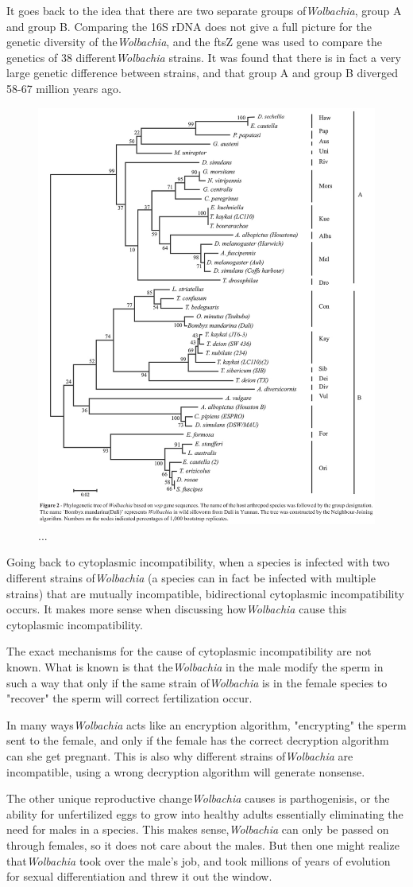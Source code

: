 \documentclass[twocolumn]{article}
\begin{document}
It goes back to the idea that there are two separate groups of\textit{Wolbachia}, group A and group B. Comparing the 16S rDNA does not give a full picture for the genetic diversity of the\textit{Wolbachia}, and the ftsZ gene was used to compare the genetics of 38 different\textit{Wolbachia} strains.\cite{Wgenetics} It was found that there is in fact a very large genetic difference between strains, and that group A and group B diverged 58-67 million years ago. 

\begin{figure}[!ht]
    \centering
    \includegraphics[width=.4\textwidth]{images/WolbachiaTree.jpg}
    \caption{ ... }
    \label{fig:wolbachiha_tree}
\end{figure}

Going back to cytoplasmic incompatibility, when a species is infected with two different strains of\textit{Wolbachia} (a species can in fact be infected with multiple strains) that are mutually incompatible, bidirectional cytoplasmic incompatibility occurs.\cite{WbiCI} It makes more sense when discussing how\textit{Wolbachia} cause this cytoplasmic incompatibility.

The exact mechanisms for the cause of cytoplasmic incompatibility are not known. What is known is that the\textit{Wolbachia} in the male modify the sperm in such a way that only if the same strain of\textit{Wolbachia} is in the female species to "recover" the sperm will correct fertilization occur.\cite{Wbio}

In many ways\textit{Wolbachia} acts like an encryption algorithm, "encrypting" the sperm sent to the female, and only if the female has the correct decryption algorithm can she get pregnant. This is also why different strains of\textit{Wolbachia} are incompatible, using a wrong decryption algorithm will generate nonsense.

The other unique reproductive change\textit{Wolbachia} causes is parthogenisis, or the ability for unfertilized eggs to grow into healthy adults essentially eliminating the need for males in a species. This makes sense,\textit{Wolbachia} can only be passed on through females, so it does not care about the males. But then one might realize that\textit{Wolbachia} took over the male's job, and took millions of years of evolution for sexual differentiation and threw it out the window.
\end{document}
